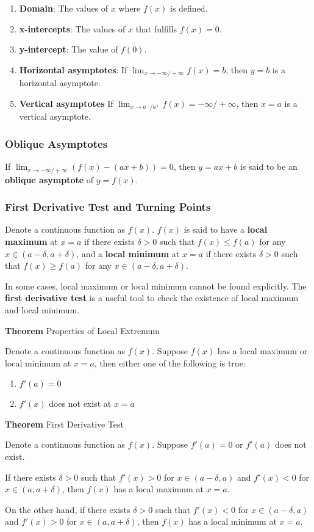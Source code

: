 \documentclass[a4paper,12pt]{article}
\newcommand{\n}{\vspace{3mm}}
\newenvironment{block}[4][Block]{ %
\begin{list}{}{
  \setlength{\leftmargin}{0mm}
  \setlength{\rightmargin}{0mm}
  \setlength{\topsep}{0mm}
  \setlength{\partopsep}{0mm}
  \parsep\parskip
  \setlength{\itemsep}{-\parsep}
  }
  \needspace{\baselineskip}
  \item \textbf{#2 #3} \hspace{1mm} #4
  \vspace{1mm}
  \item
  }
{
\end{list}
}
\newenvironment{alist}{ %
\begin{enumerate}[label=(\alph*)]
}{
\end{enumerate}
}
\begin{document}
\begin{alist}
  \item \textbf{Domain}: The values of $x$ where $f(x)$ is defined.
  \item \textbf{x-intercepts}: The values of $x$ that fulfills $f(x)=0$.
  \item \textbf{y-intercept}: The value of $f(0)$.
  \item \textbf{Horizontal asymptotes}: If $\lim_{x\to -\infty/+\infty}f(x)=b$, then $y=b$ is a horizontal asymptote.
  \item \textbf{Vertical asymptotes}  If $\lim_{x\to a^{-}/a^{+}}f(x)=-\infty/+\infty$, then $x=a$ is a vertical asymptote.
\end{alist}

\subsubsection{Oblique Asymptotes}
If $\lim_{x\to -\infty/+\infty}(f(x)-(ax+b))=0$, then $y=ax+b$ is said to be an \textbf{oblique asymptote} of $y=f(x)$.

\subsubsection{First Derivative Test and Turning Points}
Denote a continuous function as $f(x)$. $f(x)$ is said to have a \textbf{local maximum} at $x=a$ if there exists $\delta>0$ such that $f(x)\leq f(a)$ for any $x\in (a-\delta,a+\delta)$, and a \textbf{local minimum} at $x=a$ if there exists $\delta>0$ such that $f(x)\geq f(a)$ for any $x\in (a-\delta,a+\delta)$.\n

In some cases, local maximum or local minimum cannot be found explicitly. The \textbf{first derivative test} is a useful tool to check the existence of local maximum and local minimum.\n

\begin{block}{Theorem}{}{Properties of Local Extremum}
  Denote a continuous function as $f(x)$. Suppose $f(x)$ has a local maximum or local minimum at $x=a$, then either one of the following is true:

  \begin{alist}
    \item $f'(a)=0$
    \item $f'(x)$ does not exist at $x=a$
  \end{alist}
\end{block}\n

\begin{block}{Theorem}{}{First Derivative Test}
  Denote a continuous function as $f(x)$. Suppose $f'(a)=0$ or $f'(a)$ does not exist.\n

   If there exists $\delta>0$ such that $f'(x)>0$ for $x\in(a-\delta,a)$ and $f'(x)<0$ for $x\in(a,a+\delta)$, then $f(x)$ has a local maximum at $x=a$.\n

   On the other hand, if there exists $\delta>0$ such that $f'(x)<0$ for $x\in(a-\delta,a)$ and $f'(x)>0$ for $x\in(a,a+\delta)$, then $f(x)$ has a local minimum at $x=a$.
\end{block}\n
\end{document}
